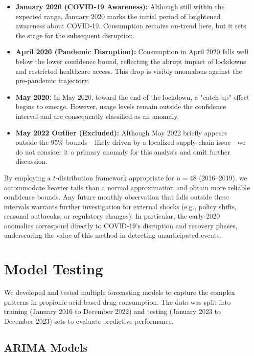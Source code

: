\documentclass[10pt]{article}
\begin{document}
\begin{itemize}
  \item \textbf{January 2020 (COVID‑19 Awareness):} Although still within the expected range, January 2020 marks the initial period of heightened awareness about COVID‑19.  Consumption remains on‐trend here, but it sets the stage for the subsequent disruption.
  \item \textbf{April 2020 (Pandemic Disruption):} Consumption in April 2020 falls well below the lower confidence bound, reflecting the abrupt impact of lockdowns and restricted healthcare access.  This drop is visibly anomalous against the pre‐pandemic trajectory.
  \item \textbf{May 2020:} In May 2020, toward the end of the lockdown, a "catch-up" effect begins to emerge. However, usage levels remain outside the confidence interval and are consequently classified as an anomaly.
  \item \textbf{May 2022 Outlier (Excluded):} Although May 2022 briefly appears outside the 95\% bounds—likely driven by a localized supply‐chain issue—we do not consider it a primary anomaly for this analysis and omit further discussion.
\end{itemize}

By employing a $t$‐distribution framework appropriate for $n=48$ (2016–2019), we accommodate heavier tails than a normal approximation and obtain more reliable confidence bounds.  Any future monthly observation that falls outside these intervals warrants further investigation for external shocks (e.g., policy shifts, seasonal outbreaks, or regulatory changes).  In particular, the early‐2020 anomalies correspond directly to COVID‑19’s disruption and recovery phases, underscoring the value of this method in detecting unanticipated events.  




\section{Model Testing}

We developed and tested multiple forecasting models to capture the complex patterns in propionic acid-based drug consumption. The data was split into training (January 2016 to December 2022) and testing (January 2023 to December 2023) sets to evaluate predictive performance.
\subsection{ARIMA Models}
\end{document}

